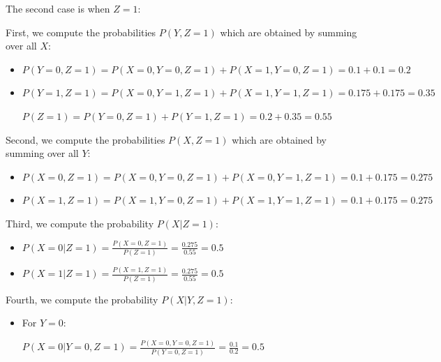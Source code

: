 \documentclass[12pt,letterpaper, onecolumn]{exam}
\begin{document}
\begin{questions}
\begin{parts}
\begin{subparts}
\begin{solution}
                The second case is when $Z=1$:

                First, we compute the probabilities $P(Y, Z=1)$ which are obtained by summing over all $X$:

                \begin{itemize}
                    \item $P(Y=0, Z=1) = P(X=0, Y=0, Z=1) + P(X=1, Y=0, Z=1) = 0.1 + 0.1 = 0.2$
                    \item $P(Y=1, Z=1) = P(X=0, Y=1, Z=1) + P(X=1, Y=1, Z=1) = 0.175 + 0.175 = 0.35$
                    
                    \begin{center}
                        $P(Z=1) = P(Y=0, Z=1) + P(Y=1, Z=1) = 0.2 + 0.35 = 0.55$
                    \end{center}
                \end{itemize}

                Second, we compute the probabilities $P(X, Z=1)$ which are obtained by summing over all $Y$:

                \begin{itemize}
                    \item $P(X=0, Z=1) = P(X=0, Y=0, Z=1) + P(X=0, Y=1, Z=1) = 0.1 + 0.175 = 0.275$
                    \item $P(X=1, Z=1) = P(X=1, Y=0, Z=1) + P(X=1, Y=1, Z=1) = 0.1 + 0.175 = 0.275$
                \end{itemize}

                Third, we compute the probability $P(X|Z=1)$:

                \begin{itemize}
                    \item $\displaystyle{P(X=0|Z=1) = \frac{P(X=0, Z=1)}{P(Z=1)} = \frac{0.275}{0.55} = 0.5}$
                    \item $\displaystyle{P(X=1|Z=1) = \frac{P(X=1, Z=1)}{P(Z=1)} = \frac{0.275}{0.55} = 0.5}$
                \end{itemize}

                Fourth, we compute the probability $P(X|Y, Z=1)$:

                \begin{itemize}
                    \item For $Y=0$:
                    \begin{center}
                    $\displaystyle{P(X=0|Y=0, Z=1) = \frac{P(X=0, Y=0, Z=1)}{P(Y=0, Z=1)} = \frac{0.1}{0.2} = 0.5}$


\end{center}
\end{itemize}
\end{solution}
\end{subparts}
\end{parts}
\end{questions}
\end{document}
